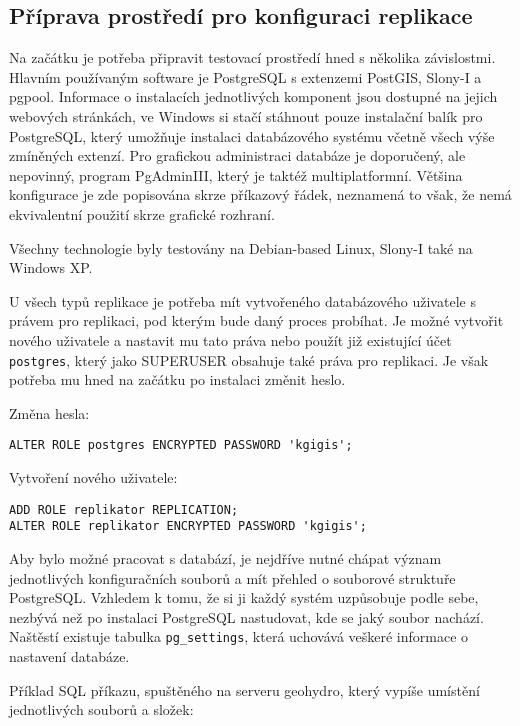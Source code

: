 \subsection{Příprava prostředí pro konfiguraci replikace}
\label{kPriprava}
Na začátku je potřeba připravit testovací prostředí hned s několika závislostmi. Hlavním používaným software je PostgreSQL s extenzemi PostGIS, Slony-I a pgpool. Informace o instalacích jednotlivých komponent jsou dostupné na jejich webových stránkách, ve Windows si stačí stáhnout pouze instalační balík pro PostgreSQL, který umožňuje instalaci databázového systému včetně všech výše zmíněných extenzí. Pro grafickou administraci databáze je doporučený, ale nepovinný, program PgAdminIII, který je taktéž multiplatformní. Většina konfigurace je zde popisována skrze příkazový řádek, neznamená to však, že nemá ekvivalentní použití skrze grafické rozhraní.

Všechny technologie byly testovány na Debian-based Linux, Slony-I také na Windows XP. 

U všech typů replikace je potřeba mít vytvořeného databázového uživatele s právem pro replikaci, pod kterým bude daný proces probíhat. Je možné vytvořit nového uživatele a nastavit mu tato práva nebo použít již existující účet \texttt{postgres}, který jako SUPERUSER obsahuje také práva pro replikaci. Je však potřeba mu hned na začátku po instalaci změnit heslo.

Změna hesla:

\begin{lstlisting}
ALTER ROLE postgres ENCRYPTED PASSWORD 'kgigis';
\end{lstlisting}

Vytvoření nového uživatele:

\begin{lstlisting}
ADD ROLE replikator REPLICATION;
ALTER ROLE replikator ENCRYPTED PASSWORD 'kgigis';
\end{lstlisting}

Aby bylo možné pracovat s databází, je nejdříve nutné chápat význam jednotlivých konfiguračních souborů a mít přehled o souborové struktuře PostgreSQL. Vzhledem k tomu, že si ji každý systém uzpůsobuje podle sebe, nezbývá než po instalaci PostgreSQL nastudovat, kde se jaký soubor nachází. Naštěstí existuje tabulka \texttt{pg\_settings}, která uchovává veškeré informace o nastavení databáze. 

Příklad SQL příkazu, spuštěného na serveru geohydro, který vypíše umístění jednotlivých souborů a složek:

